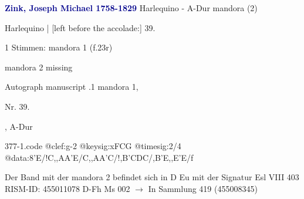 \documentclass[twocolumn]{book}
\begin{document}
\newline \par \vspace{7pt} \textcolor{darkblue}{\textbf{Zink, Joseph Michael  1758-1829}}
\newline Harlequino - A-Dur
\newline mandora (2)
\newline \begin{itshape}[f.23r, at left:] Harlequino | [left before the accolade:] 39.\end{itshape} 
\newline \textcolor{darkblue}{}  1 Stimmen: mandora 1  (f.23r)
\newline \begin{small} mandora 2 missing\end{small} 
\newline Autograph manuscript
.1  mandora 1, \begin{itshape}Nr. 39.\end{itshape}, A-Dur  
\begin{filecontents*}{377-1.code}
@clef:g-2
@keysig:xFCG
@timesig:2/4
@data:8'E/!C,,AA'E/C,,AA'C/!{,B'C}{DC}/,B'E,,E'E/f
\end{filecontents*}
\newline
%
\newline Der Band mit der mandora 2 befindet sich in D Eu mit der Signatur Esl VIII 403
\newline RISM-ID: 455011078
\newline D-Fh  Ms 002
\newline $\rightarrow$ In Sammlung 419 (455008345)
      
\end{document}
